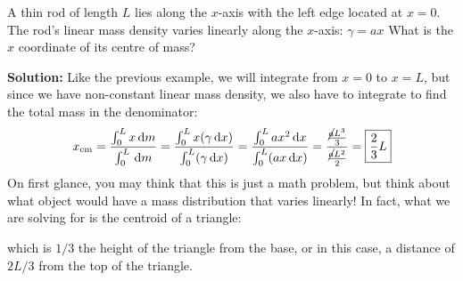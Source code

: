 \begin{example}
  A thin rod of length $L$ lies along the $x$-axis with the left edge located
  at $x=0$. The rod's linear mass density varies linearly along the $x$-axis:
  $\gamma=ax$ What is the $x$ coordinate of its centre of mass?
  \begin{center}
  \end{center}
  \textbf{Solution:} Like the previous example, we will integrate from $x=0$ to
  $x=L$, but since we have non-constant linear mass density, we also have to
  integrate to find the total mass in the denominator:
  \begin{equation*}
    x_\text{cm}
    =\frac{\int_0^Lx\dl m}{\int_0^L\dl m}
    =\frac{\int_0^Lx(\gamma\dl x)}{\int_0^L(\gamma\dl x)}
    =\frac{\int_0^Lax^2\dl x}{\int_0^L(ax\dl x)}
    =\frac{\frac{\cancel{a}L^3}3}{\frac{\cancel{a}L^2}2}
    =\boxed{\frac 23L}
  \end{equation*}
  On first glance, you may think that this is just a math problem, but think
  about what object would have a mass distribution that varies linearly! In
  fact, what we are solving for is the centroid of a triangle:
  \begin{center}
    \vspace{-.2in}
  \end{center}
  \vspace{-.2in}which is $1/3$ the height of the triangle from the base, or in
  this case, a distance of $2L/3$ from the top of the triangle.
\end{example}


